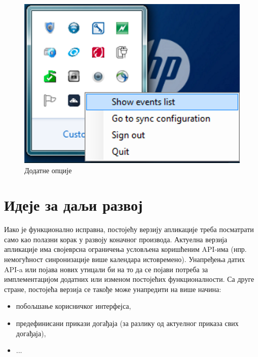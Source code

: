 \begin{figure}[H]
	\centering
	\includegraphics[scale=0.5]{slike/IconRightClick.png}
	\caption{Додатне опције}
	\label{fig:icon_right_click}
\end{figure}

\section{Идеје за даљи развој}

Иако је функционално исправна, постојећу верзију апликације треба посматрати само као полазни корак у развоју коначног производа. Актуелна верзија апликације има својеврсна ограничења условљена коришћеним API-има (нпр. немогућност синронизације више календара истовремено). Унапређења датих API-a или појава нових утицали би на то да се појави потреба за имплементацијом додатних или изменом постојећих функционалности. Са друге стране, постојећа верзија се такође може унапредити на више начина:
\begin{itemize}
	\item{побољшање корисничког интерфејса},
	\item{предефинисани прикази догађаја (за разлику од актуелног приказа свих догађаја)},
	\item{...}
\end{itemize}